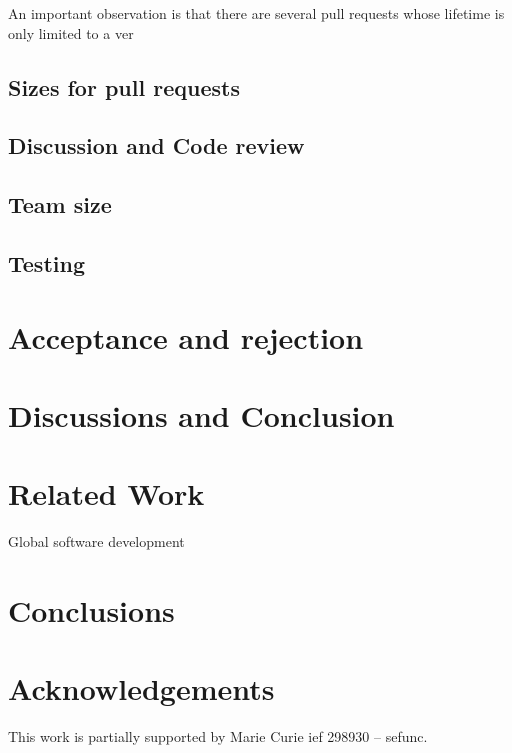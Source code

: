 \documentclass[conference]{IEEEtran}
\begin{document}
An important observation is that there are several pull requests whose
lifetime is only limited to a ver

\subsection{Sizes for pull requests}



\subsection{Discussion and Code review}

\subsection{Team size}

\subsection{Testing}

\section{Acceptance and rejection}

\section{Discussions and Conclusion}

\section{Related Work}

\cite{Bird09}
\cite{Cornf10}
\cite{Dabbi12}
\cite{Bird12}
\cite{Barr12}
\cite{Buffe99}
\cite{Mens02}
\cite{Shiha12}

Global software development
\section{Conclusions}

\section*{Acknowledgements}
This work is partially supported by Marie Curie {\sc ief} 298930 -- {\sc sefunc}.



\end{document}
